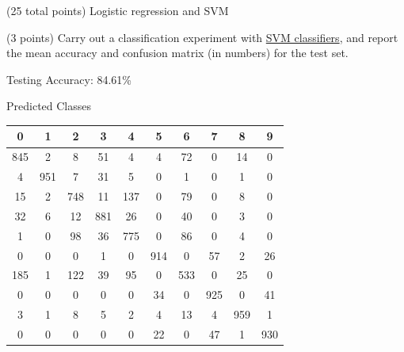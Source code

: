 \documentclass[12pt]{article}
\begin{document}
\begin{question}{(25 total points) Logistic regression and SVM}
\begin{subquestion}
\begin{answerbox}{30em}
    \end{answerbox}
  


   \end{subquestion}
   \begin{subquestion}{(3 points)
       Carry out a classification experiment with
       \href{https://scikit-learn.org/0.19/modules/generated/sklearn.svm.SVC.html}{SVM classifiers}, and report the
       mean accuracy and confusion matrix (in numbers) for the test
       set.
     } \label{Q2.2}


   

      \begin{answerbox}{30em}
         Testing Accuracy: 84.61\%\newline
             \newline
        \centerline{Predicted Classes}
        \begin{center}
        \begin{tabular}{c|c|c|c|c|c|c|c|c|c}
        \hline
        \multicolumn{1}{c}{\bfseries 0} & \multicolumn{1}{c}{\bfseries 1} & \multicolumn{1}{c}{\bfseries 2} & \multicolumn{1}{c}{\bfseries 3} &
        \multicolumn{1}{c}{\bfseries 4} & \multicolumn{1}{c}{\bfseries 5} &
        \multicolumn{1}{c}{\bfseries 6} & \multicolumn{1}{c}{\bfseries 7} &
        \multicolumn{1}{c}{\bfseries 8} & \multicolumn{1}{c}{\bfseries 9} \\ \hline
        845    & 2   & 8  & 51  & 4   & 4   & 72  & 0   & 14  & 0   \\ 
        4      & 951 & 7   & 31  & 5   & 0   & 1   & 0   & 1   & 0   \\ 
        15     & 2   & 748 & 11  & 137 & 0   & 79  & 0   & 8   & 0  \\ 
        32     & 6  & 12  & 881 & 26  & 0   & 40  & 0   & 3   & 0   \\ 
        1      & 0   & 98 & 36  & 775 & 0   & 86  & 0   & 4  & 0   \\ 
        0      & 0   & 0   & 1   & 0   & 914 & 0   & 57  & 2  & 26  \\ 
        185    & 1   & 122 & 39  & 95 & 0   & 533 & 0   & 25  & 0   \\ 
        0      & 0   & 0   & 0   & 0   & 34  & 0   & 925 & 0   & 41  \\ 
        3      & 1   & 8   & 5  & 2   & 4   & 13  & 4   & 959 & 1   \\ 
        0      & 0   & 0   & 0   & 0   & 22  & 0   & 47  & 1   & 930 \\ 
        \hline
        \end{tabular}
        \end{center}      
         

\end{answerbox}
\end{subquestion}
\end{question}
\end{document}

